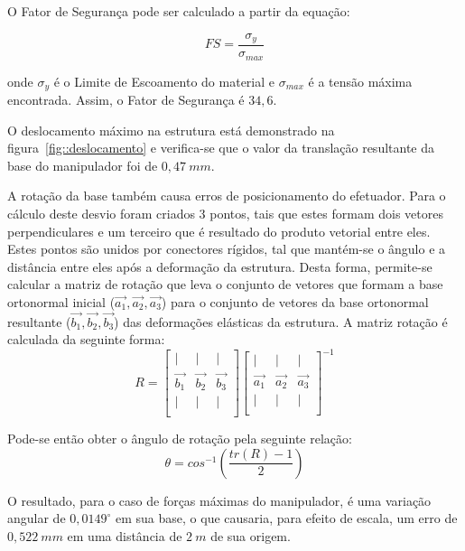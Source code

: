 O Fator de Segurança pode ser calculado a partir da equação: 

\begin{equation*}
	FS=\frac{\sigma _y}{\sigma _{max}}
\end{equation*}

onde $\sigma_y$ é o Limite de Escoamento do material e $\sigma_{max}$ é a tensão
máxima encontrada. Assim, o Fator de Segurança é $34,6$.

O deslocamento máximo na estrutura está demonstrado na
figura~\ref{fig::deslocamento} e verifica-se que o valor da translação
resultante da base do manipulador foi de $0,47~mm$.

A rotação da base também causa erros de posicionamento do efetuador. Para o
cálculo deste desvio foram criados 3 pontos, tais que estes formam dois
vetores perpendiculares e um terceiro que é resultado do produto vetorial entre eles.
Estes pontos são unidos por conectores rígidos, tal que mantém-se o ângulo e a
distância entre eles após a deformação da estrutura. Desta forma, permite-se
calcular a matriz de rotação que leva o conjunto de vetores que formam a base
ortonormal inicial ($\vec{a_1},\vec{a_2},\vec{a_3}$) para o conjunto de
vetores da base ortonormal resultante ($\vec{b_1},\vec{b_2},\vec{b_3}$) das
deformações elásticas da estrutura. A matriz rotação é calculada da seguinte forma:
\begin{equation*}
R=
\begin{bmatrix}
	    |   &       |   &      |      \\
	\vec{b_1} & \vec{b_2} & \vec{b_3} \\
	    |   &       |   &      |      \\
\end{bmatrix}
\begin{bmatrix}
	    |   &       |   &      |      \\
	\vec{a_1} & \vec{a_2} & \vec{a_3} \\
	    |   &       |   &      |      \\
\end{bmatrix} ^{-1}
\end{equation*}

Pode-se então obter o ângulo de rotação pela seguinte relação:
\begin{equation*}
	\theta=cos^{-1} \left(\frac{tr(R)-1}{2}\right)
\end{equation*}

O resultado, para o caso de forças máximas do manipulador, é uma variação
angular de $0,0149^{\circ}$ em sua base, o que causaria, para efeito de
escala, um erro de $0,522~mm$ em uma distância de $2~m$ de sua origem.


